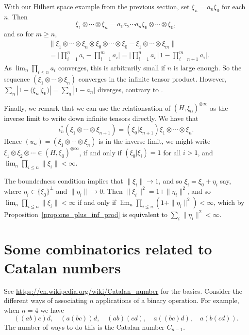 \documentclass[twoside,a4paper,12pt]{article}
\theoremstyle{plain}
\theoremstyle{definition}
\begin{document}
With our Hilbert space example from the previous section, set $\xi_n = a_n \xi_0$ for each $n$.  Then 
\[ \xi_1 \otimes\cdots \otimes \xi_n = a_1a_2\cdots a_n \xi_0\otimes\cdots\otimes\xi_0, \]
and so for $m \geq n$,
\begin{align*}
& \| \xi_1\otimes\cdots\otimes\xi_n\otimes\xi_0\otimes\cdots\otimes\xi_0 - \xi_1\otimes\cdots\otimes\xi_m \| \\
&= \Big| \prod_{i=1}^n a_i - \prod_{i=1}^m a_i \Big|
= \Big| \prod_{i=1}^n a_i \Big| \Big| 1 - \prod_{i=n+1}^m a_i \Big|.
\end{align*}
As $\lim_n \prod_{i\leq n} a_i$ converges, this is arbitrarily small if $n$ is large enough.  So the sequence $(\xi_1\otimes\cdots\otimes\xi_n)$ converges in the infinite tensor product.  However, $\sum_n |1-(\xi_n|\xi_0)| = \sum_n |1-a_n|$ diverges, contrary to \cite[Lemma~XIV.1.7]{tak3}.

\medskip

Finally, we remark that we can use the relationsation of $(H,\xi_0)^{\otimes\infty}$ as the inverse limit to write down infinite tensors directly.  We have that
\[ \iota_n^*(\xi_1\otimes\cdots\otimes\xi_{n+1}) = (\xi_0|\xi_{n+1}) \xi_1\otimes\cdots\otimes\xi_{n}. \]
Hence $(u_n) = (\xi_1\otimes\cdots\otimes\xi_{n})$ is in the inverse limit, we might write $\xi_1\otimes\xi_2\otimes\cdots \in (H,\xi_0)^{\otimes\infty}$, if and only if $(\xi_0|\xi_i)=1$ for all $i > 1$, and $\lim_n \prod_{i\leq n} \|\xi_i\| < \infty$.

The boundedness condition implies that $\|\xi_i\| \to 1$, and so $\xi_i = \xi_0 + \eta_i$ say, where $\eta_i \in \{ \xi_0 \}^\perp$ and $\|\eta_i\|\to 0$.  Then $\|\xi_i\|^2 = 1 + \|\eta_i\|^2$, and so $\lim_n \prod_{i\leq n} \|\xi_i\| < \infty$ if and only if $\lim_n \prod_{i\leq n} (1+\|\eta_i\|^2) < \infty$, which by Proposition~\ref{prop:one_plus_inf_prod} is equivalent to $\sum_i \|\eta_i\|^2 < \infty$.




\section{Some combinatorics related to Catalan numbers}

See \url{https://en.wikipedia.org/wiki/Catalan_number} for the basics.  Consider the different ways of associating $n$ applications of a binary operation.  For example, when $n=4$ we have
\[ ((ab)c)d, \quad  (a(bc))d, \quad   (ab)(cd), \quad   a((bc)d), \quad   a(b(cd)). \]
The number of ways to do this is the Catalan number $C_{n-1}$.
\end{document}
